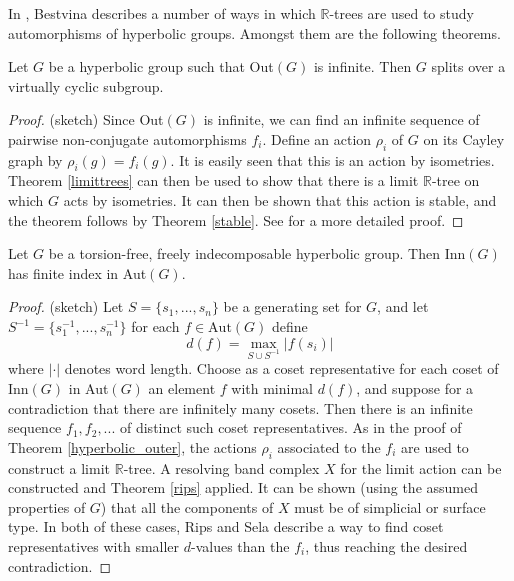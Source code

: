 \subsubsection{} 
In \cite{Bestvina_trees}, Bestvina describes a number of ways in which $\mathbb{R}$-trees are used to study automorphisms of hyperbolic groups. Amongst them are the following theorems.
\begin{theorem}\label{hyperbolic_outer}
    Let $G$ be a hyperbolic group such that Out$(G)$ is infinite. Then $G$ splits over a virtually cyclic subgroup.
\end{theorem}

\begin{proof} (sketch)
    Since Out$(G)$ is infinite, we can find an infinite sequence of pairwise non-conjugate automorphisms $f_i$. Define an action $\rho_i$ of $G$ on its Cayley graph by $\rho_i(g)=f_i(g)$. It is easily seen that this is an action by isometries. Theorem \ref{limittrees} can then be used to show that there is a limit $\mathbb{R}$-tree on which $G$ acts by isometries. It can then be shown that this action is stable, and the theorem follows by Theorem \ref{stable}. See \cite{BridsonSwarup} for a more detailed proof.
\end{proof}

\begin{theorem}
    Let $G$ be a torsion-free, freely indecomposable hyperbolic group. Then Inn$(G)$ has finite index in Aut$(G)$.
\end{theorem}
\begin{proof}
    (sketch) Let $S=\{s_1,...,s_n\}$ be a generating set for $G$, and let $S^{-1}=\{s_1^{-1},...,s_n^{-1}\}$ for each $f\in \text{Aut}(G)$ define \[d(f)=\max_{S\cup S^{-1}}\lvert f(s_i)\rvert\] where $\lvert \cdot \rvert$ denotes word length. Choose as a coset representative for each coset of Inn$(G)$ in Aut$(G)$ an element $f$ with minimal $d(f)$, and suppose for a contradiction that there are infinitely many cosets. Then there is an infinite sequence $f_1,f_2,...$ of distinct such coset representatives. As in the proof of Theorem \ref{hyperbolic_outer}, the actions $\rho_i$ associated to the $f_i$ are used to construct a limit $\mathbb{R}$-tree. A resolving band complex $X$ for the limit action can be constructed and Theorem \ref{rips} applied. It can be shown (using the assumed properties of $G$) that all the components of $X$ must be of simplicial or surface type. In both of these cases, Rips and Sela describe a way to find coset representatives with smaller $d$-values than the $f_i$, thus reaching the desired contradiction.
\end{proof}


